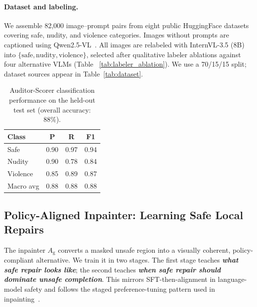 \documentclass[11pt]{article}
\newcommand{\Ag}{A_{\mathrm{g}}}
\begin{document}
\paragraph{Dataset and labeling.}
We assemble 82,000 image--prompt pairs from eight public HuggingFace datasets
covering safe, nudity, and violence categories. Images without prompts are
captioned using Qwen2.5-VL~\cite{bai2025qwen25vltechnicalreport}. All images
are relabeled with InternVL-3.5 (8B)~\cite{internvl3p5} into
$\{\mathrm{safe},\mathrm{nudity},\mathrm{violence}\}$, selected after
qualitative labeler ablations against four alternative VLMs
(Table ~\ref{tab:labeler_ablation}). We use a 70/15/15 split; dataset
sources appear in Table~\ref{tab:dataset}.

\begin{table}[t]
\centering
\small
\setlength{\tabcolsep}{5pt}
\begin{tabular}{lccc}
\toprule
\textbf{Class} & \textbf{P} & \textbf{R} & \textbf{F1} \\
\midrule
Safe     & 0.90 & 0.97 & 0.94 \\
Nudity   & 0.90 & 0.78 & 0.84 \\
Violence & 0.85 & 0.89 & 0.87 \\
\midrule
Macro avg & 0.88 & 0.88 & 0.88 \\
\bottomrule
\end{tabular}
\caption{Auditor-Scorer classification performance on the held-out test set
(overall accuracy: 88\%).}
\label{tab:auditor_perf}
\end{table}

\subsection{Policy-Aligned Inpainter: Learning Safe Local Repairs}
\label{sec:inpainter}

The inpainter $\Ag$ converts a masked unsafe region into a visually coherent,
policy-compliant alternative. We train it in two stages. The first stage
teaches \textbf{\emph{what safe repair looks like}}; the second teaches
\textbf{\emph{when safe repair should dominate unsafe completion}}. This
mirrors SFT-then-alignment in language-model safety and follows the staged
preference-tuning pattern used in inpainting~\cite{liu2024prefpaint}.
\end{document}
